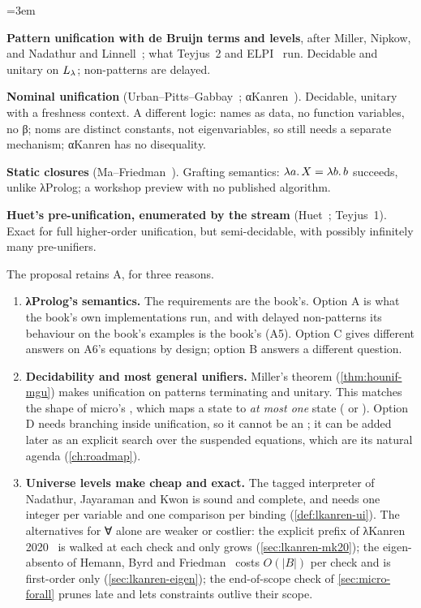 \begin{description}\emergencystretch=3em
\item[A.] \textbf{Pattern unification with de Bruijn terms and levels}, after Miller, Nipkow, and
  Nadathur and Linnell~\cite{Miller1991,Nipkow1993,NadathurLinnell2005}; what Teyjus~2 and
  ELPI~\cite{DunchevEtAl2015} run. Decidable and unitary on $L_\lambda$; non-patterns are delayed.
\item[B.] \textbf{Nominal unification} (Urban--Pitts--Gabbay~\cite{UrbanPittsGabbay2004}; αKanren~\cite{ByrdFriedman2007}). Decidable, unitary with a freshness
  context. A different logic: names as data, no function variables, no β; noms are distinct constants,
  not eigenvariables, so  still needs a separate mechanism; αKanren has no disequality.
\item[C.] \textbf{Static closures} (Ma--Friedman~\cite{MaFriedman2021}). Grafting semantics: $\lambda a.\,X=\lambda b.\,b$ succeeds,
  unlike λProlog; a workshop preview with no published algorithm.
\item[D.] \textbf{Huet's pre-unification, enumerated by the stream} (Huet~\cite{Huet1975}; Teyjus~1). Exact for full higher-order
  unification, but semi-decidable, with possibly infinitely many pre-unifiers.
\end{description}

\noindent The proposal retains A, for three reasons.

\begin{enumerate}\emergencystretch=3em
\item \textbf{λProlog's semantics.} The requirements are the book's. Option A is what the book's own
  implementations run, and with delayed non-patterns its behaviour on the book's examples is the book's
  (A5). Option C gives different answers on A6's equations by design; option B answers a different
  question.
\item \textbf{Decidability and most general unifiers.} Miller's theorem (\cref{thm:hounif-mgu}) makes
  unification on patterns terminating and unitary. This matches the shape of micro's , which
  maps a state to \emph{at most one} state ( or ). Option D needs branching inside
  unification, so it cannot be an ; it can be added later as an explicit search over the
  suspended equations, which are its natural agenda (\cref{ch:roadmap}).
\item \textbf{Universe levels make  cheap and exact.} The tagged interpreter of Nadathur,
  Jayaraman and Kwon is sound and complete, and needs one integer per variable and one comparison per
  binding (\cref{def:lkanren-ui}). The alternatives for ∀ alone are weaker or costlier: the explicit
  prefix of λKanren 2020~\cite{MaLuFriedman2020} is walked at each check and only grows (\cref{sec:lkanren-mk20}); the
  eigen-absento of Hemann, Byrd and Friedman~\cite{HemannByrdFriedman2013} costs $O(|B|)$ per check and is first-order only
  (\cref{sec:lkanren-eigen}); the end-of-scope check of \cref{sec:micro-forall} prunes late and lets
  constraints outlive their scope.
\end{enumerate}

